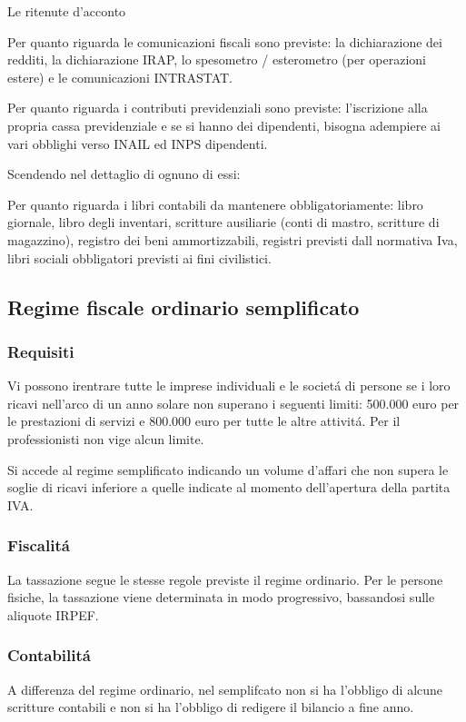 \documentclass{article}
\begin{document}
Le ritenute d'acconto

Per quanto riguarda le comunicazioni fiscali sono previste:
la dichiarazione dei redditi, 
la dichiarazione IRAP,
lo spesometro / esterometro (per operazioni estere) e 
le comunicazioni INTRASTAT.

Per quanto riguarda i contributi previdenziali sono previste:
l'iscrizione alla propria cassa previdenziale e
se si hanno dei dipendenti, bisogna adempiere ai vari obblighi verso INAIL ed INPS dipendenti.

Scendendo nel dettaglio di ognuno di essi:

Per quanto riguarda i libri contabili da mantenere obbligatoriamente:
libro giornale, libro degli inventari, scritture ausiliarie (conti di mastro, scritture di magazzino), 
registro dei beni ammortizzabili, registri previsti dall normativa Iva, libri sociali obbligatori previsti ai fini civilistici.

\subsection{Regime fiscale ordinario semplificato}
\subsubsection{Requisiti}
Vi possono irentrare tutte le imprese individuali e le societ\'a di persone se i loro ricavi nell'arco di un anno solare 
non superano i seguenti limiti: 500.000 euro per le prestazioni di servizi e 800.000 euro per tutte le altre attivit\'a.
Per il professionisti non vige alcun limite.

Si accede al regime semplificato indicando un volume d'affari che non supera le soglie di ricavi inferiore a quelle indicate al momento dell'apertura della partita IVA.

\subsubsection{Fiscalit\'a}
La tassazione segue le stesse regole previste il regime ordinario. Per le persone fisiche, la tassazione viene determinata in modo progressivo, bassandosi sulle aliquote IRPEF.

\subsubsection{Contabilit\'a}
A differenza del regime ordinario, nel semplifcato non si ha l'obbligo di alcune scritture contabili e non si ha l'obbligo di redigere il bilancio a fine anno.
\end{document}
